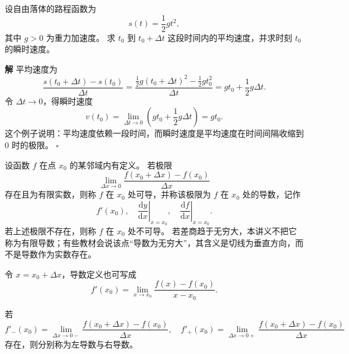 \documentclass[fontset=fandol]{ctexart}
\newenvironment{solution}{\par\noindent\textbf{解}\quad}{\hfill$\square$\par\vspace{0.8em}}
\newcommand{\dd}{\mathrm{d}}
\begin{document}
\begin{center}
\end{center}

\begin{example}[平均速度与瞬时速度]
设自由落体的路程函数为
\[
s(t)=\frac12gt^2,
\]
其中 $g>0$ 为重力加速度。 求 $t_0$ 到 $t_0+\Delta t$ 这段时间内的平均速度，并求时刻 $t_0$ 的瞬时速度。
\end{example}
\begin{solution}
平均速度为
\[
\frac{s(t_0+\Delta t)-s(t_0)}{\Delta t}
=\frac{\frac12g(t_0+\Delta t)^2-\frac12gt_0^2}{\Delta t}
=gt_0+\frac12g\Delta t.
\]
令 $\Delta t\to0$，得瞬时速度
\[
v(t_0)=\lim_{\Delta t\to0}\left(gt_0+\frac12g\Delta t\right)=gt_0.
\]
这个例子说明：平均速度依赖一段时间，而瞬时速度是平均速度在时间间隔收缩到 $0$ 时的极限。
\end{solution}

\begin{definition}[导数]
设函数 $f$ 在点 $x_0$ 的某邻域内有定义。 若极限
\[
\lim_{\Delta x\to0}\frac{f(x_0+\Delta x)-f(x_0)}{\Delta x}
\]
存在且为有限实数，则称 $f$ 在 $x_0$ 处可导，并称该极限为 $f$ 在 $x_0$ 处的导数，记作
\[
f'(x_0),\quad \left.\frac{\dd y}{\dd x}\right|_{x=x_0},\quad \left.\frac{\dd f}{\dd x}\right|_{x=x_0}.
\]
若上述极限不存在，则称 $f$ 在 $x_0$ 处不可导。 若差商趋于无穷大，本讲义不把它称为有限导数；有些教材会说该点“导数为无穷大”，其含义是切线为垂直方向，而不是导数作为实数存在。
\end{definition}

令 $x=x_0+\Delta x$，导数定义也可写成
\[
f'(x_0)=\lim_{x\to x_0}\frac{f(x)-f(x_0)}{x-x_0}.
\]

\begin{definition}[左导数与右导数]
若
\[
f'_-(x_0)=\lim_{\Delta x\to0-}\frac{f(x_0+\Delta x)-f(x_0)}{\Delta x},\quad
f'_+(x_0)=\lim_{\Delta x\to0+}\frac{f(x_0+\Delta x)-f(x_0)}{\Delta x}
\]
存在，则分别称为左导数与右导数。
\end{definition}
\end{document}
